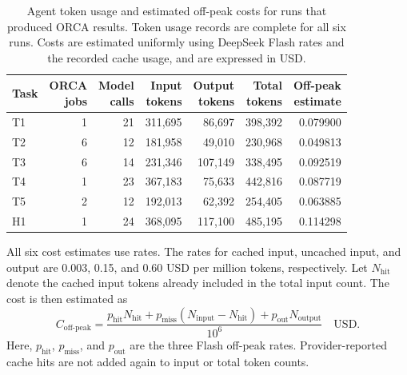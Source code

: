 \begin{table}[H]
  \centering\small
  \setlength{\tabcolsep}{4pt}
  \caption{Agent token usage and estimated off-peak costs for runs that produced ORCA results.
  Token usage records are complete for all six runs.
  Costs are estimated uniformly using DeepSeek Flash rates and the recorded cache usage, and are expressed in USD.}
  \label{tab:token-cost}
  \begin{tabular*}{\linewidth}{@{\extracolsep{\fill}}lrrrrrr@{}}
    \toprule
    Task & \shortstack[r]{ORCA\\jobs} & \shortstack[r]{Model\\calls} & \shortstack[r]{Input\\tokens} & \shortstack[r]{Output\\tokens} & \shortstack[r]{Total\\tokens} & \shortstack[r]{Off-peak\\estimate}\\
    \midrule
    T1 & 1 & 21 & 311,695 & 86,697 & 398,392 & 0.079900\\
    T2 & 6 & 12 & 181,958 & 49,010 & 230,968 & 0.049813\\
    T3 & 6 & 14 & 231,346 & 107,149 & 338,495 & 0.092519\\
    T4 & 1 & 23 & 367,183 & 75,633 & 442,816 & 0.087719\\
    T5 & 2 & 12 & 192,013 & 62,392 & 254,405 & 0.063885\\
    H1 & 1 & 24 & 368,095 & 117,100 & 485,195 & 0.114298\\
    \bottomrule
  \end{tabular*}
\end{table}

All six cost estimates use  rates.
The rates for cached input, uncached input, and output are 0.003, 0.15, and 0.60 USD per million tokens, respectively.
Let $N_{\mathrm{hit}}$ denote the cached input tokens already included in the total input count.
The cost is then estimated as
\begin{equation}
  C_{\mathrm{off\text{-}peak}}=
  \frac{p_{\mathrm{hit}}N_{\mathrm{hit}}
  +p_{\mathrm{miss}}(N_{\mathrm{input}}-N_{\mathrm{hit}})
  +p_{\mathrm{out}}N_{\mathrm{output}}}{10^6}
  \quad\text{USD}.
  \label{eq:token-cost}
\end{equation}
Here, $p_{\mathrm{hit}}$, $p_{\mathrm{miss}}$, and $p_{\mathrm{out}}$ are the three Flash off-peak rates.
Provider-reported cache hits are not added again to input or total token counts.

